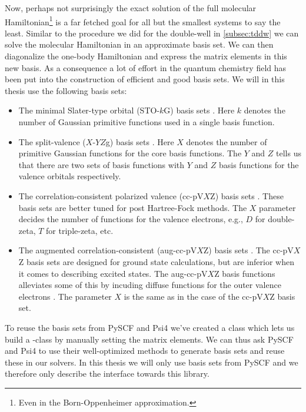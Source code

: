         Now, perhaps not surprisingly the exact solution of the full molecular
        Hamiltonian\footnote{%
            Even in the Born-Oppenheimer approximation.
        } is a far fetched goal for all but the smallest systems to say the
        least.
        Similar to the procedure we did for the double-well in
        \autoref{subsec:tddw} we can solve the molecular Hamiltonian in an
        approximate basis set.
        We can then diagonalize the one-body Hamiltonian and express the
        matrix elements in this new basis.
        As a consequence a lot of effort in the quantum chemistry field has been
        put into the construction of efficient and good basis sets.
        We will in this thesis use the following basis sets:
        \begin{itemize}
            \item The minimal Slater-type orbital (STO-$k$G) basis sets
                \cite{sto-3g}.
                Here $k$ denotes the number of Gaussian primitive functions used
                in a single basis function.
            \item The split-valence ($X$-$YZ$g) basis sets \cite{x-yzg}.
                Here $X$ denotes the number of primitive Gaussian functions for
                the core basis functions.
                The $Y$ and $Z$ tells us that there are two sets of basis
                functions with $Y$ and $Z$ basis functions for the valence
                orbitals respectively.
            \item The correlation-consistent polarized valence (cc-pV$X$Z) basis
                sets \cite{cc-pVXZ}.
                These basis sets are better tuned for post Hartree-Fock methods.
                The $X$ parameter decides the number of functions for the
                valence electrons, e.g., $D$ for double-zeta, $T$ for
                triple-zeta, etc.
            \item The augmented correlation-consistent (aug-cc-pV$X$Z) basis
                sets \cite{aug-cc-pVXZ}.
                The cc-pV$X$Z basis sets are designed for ground state
                calculations, but are inferior when it comes to describing
                excited states.
                The aug-cc-pV$X$Z basis functions alleviates some of this by
                incuding diffuse functions for the outer valence electrons
                \cite{helgaker-molecular}.
                The parameter $X$ is the same as in the case of the cc-pV$X$Z
                basis set.
        \end{itemize}
        To reuse the basis sets from PySCF \cite{pyscf} and Psi4 \cite{psi4}
        we've created a class  which lets us build a
        -class by manually setting the matrix elements.
        We can thus ask PySCF and Psi4 to use their well-optimized methods to
        generate basis sets and reuse these in our solvers.
        In this thesis we will only use basis sets from PySCF and we therefore
        only describe the interface towards this library.

